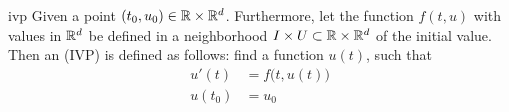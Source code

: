 \begin{Definition}{ivp}
    \label{def:awa}
   Given a point
  $(t_0,u_0)\in \mathbb R \times \mathbb R^d$.  Furthermore, let the function
  $f(t,u)$ with values in $\mathbb R^d$ be defined in a neighborhood
  $I\times U \subset \mathbb R\times \mathbb R^d$ of the initial value.  Then an
   (IVP) is defined as follows: find a
  function $u(t)$, such that
  \begin{subequations}
    \label{eq:awa}
    \begin{align}
      \label{eq:awa:2}
      u'(t)&=f\bigl(t,u(t)\bigr)
      \\
      \label{eq:awa:3}
      u(t_0)&=u_0
  \end{align}
  \end{subequations}
\end{Definition}